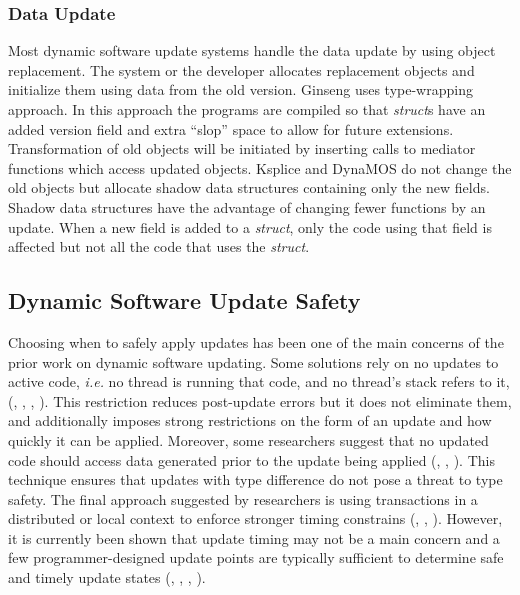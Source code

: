 \documentclass[a4paper,11pt,twoside]{article}
\begin{document}
\subsubsection{Data Update} 
Most dynamic software update systems handle the data update by using object replacement. The system or the developer allocates replacement objects and initialize them using data from the old version. Ginseng uses type-wrapping approach. In this approach the programs are compiled so that \textit{struct}s have an added version field and extra “slop” space to allow for future extensions. Transformation of old objects will be initiated by inserting calls to mediator functions which access updated objects. Ksplice and DynaMOS do not change the old objects but allocate shadow data structures containing only the new fields. Shadow data structures have the advantage of changing fewer functions by an update. When a new field is added to a \textit{struct}, only the code using that field is affected but not all the code that uses the \textit{struct}. 


\subsection{Dynamic Software Update Safety}
Choosing when to safely apply updates has been one of the main concerns of the prior work on dynamic software updating. Some solutions rely on no updates to active code, \textit{i.e.} no thread is running that code, and no thread's stack refers to it, (\cite{Safety 32}, \cite{Ksplice}, \cite{K42}, \cite{Safety 43} ). This restriction reduces post-update errors but it does not eliminate them, and additionally imposes strong restrictions on the form of an update and how quickly it can be applied. Moreover, some researchers suggest that no updated code should access data generated prior to the update being applied (\cite{Safety 213}, \cite{Safety 214}, \cite{Safety 267}). This technique ensures that updates with type difference do not pose a threat to type safety. The final approach suggested by researchers is using transactions in a distributed or local context to enforce stronger timing constrains (\cite{Safety 173}, \cite{Safety 215}, \cite{Safety 279}). However, it is currently been shown that update timing may not be a main concern and a few programmer-designed update points are typically sufficient to determine safe and timely update states (\cite{Safety 213}, \cite{Kitsune}, \cite{Safety 131}, \cite{Safety 108}). 
\end{document}
